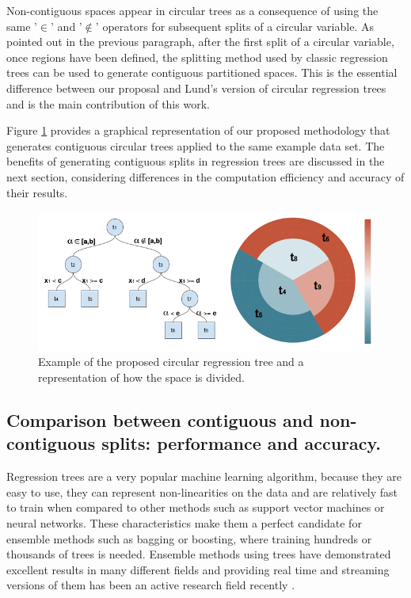 \documentclass[times,twocolumn,final,authoryear]{elsarticle}
\begin{document}
Non-contiguous spaces appear in circular trees as a consequence of using the same '$\in$' and '$\notin$' operators for subsequent splits of a circular variable. As pointed out in the previous paragraph, after the first split of a circular variable, once regions have been defined, the splitting method used by classic regression trees can be used to generate contiguous partitioned spaces. This is the essential difference between our proposal and Lund's version of circular regression trees and is the main contribution of this work.

Figure \ref{f4} provides a graphical representation of our proposed methodology that generates contiguous circular trees applied to the same example data set. The benefits of generating contiguous splits in regression trees are discussed in the next section, considering differences in the computation efficiency and accuracy of their results.

%
\begin{figure}
  \includegraphics[width=17cm]{fig4_master.png}
\caption{Example of the proposed circular regression tree and a representation of how the space is divided.}
\label{f4}       %
\end{figure}
%


\subsection{Comparison between contiguous and non-contiguous splits: performance and accuracy.}

Regression trees are a very popular machine learning algorithm, because they are easy to use, they can represent non-linearities on the data and are relatively fast to train when compared to other methods such as support vector machines or neural networks. These characteristics make them a perfect candidate for ensemble methods such as bagging or boosting, where training hundreds or thousands of trees is needed. Ensemble methods using trees have demonstrated excellent results in many different fields and providing real time and streaming versions of them has been an active research field recently \citep{Abdulsalametal2007}.
\end{document}
